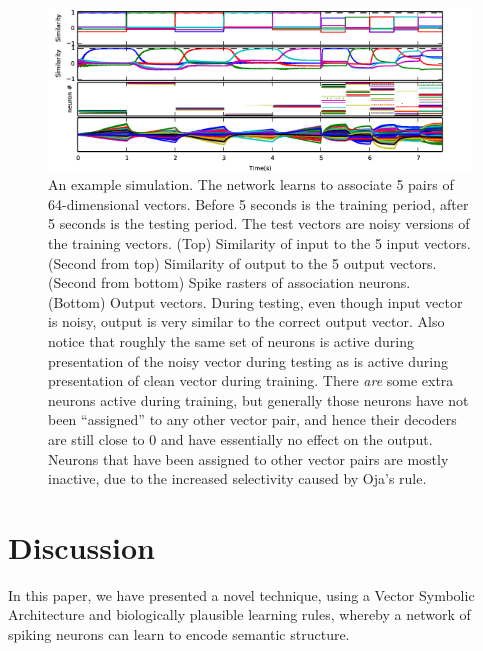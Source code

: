\documentclass[10pt,letterpaper]{article}
\begin{document}
\begin{figure}[ht]
\begin{center}
\includegraphics[width=\textwidth]{../default_plots/example_plot_D_64_N_5.png}
\end{center}
\caption{An example simulation. The network learns to associate 5 pairs of 64-dimensional vectors. Before 5 seconds is the training period, after 5 seconds is the testing period. The test vectors are noisy versions of the training vectors. (Top) Similarity of input to the 5 input vectors. (Second from top) Similarity of output to the 5 output vectors. (Second from bottom) Spike rasters of association neurons. (Bottom) Output vectors. During testing, even though input vector is noisy, output is very similar to the correct output vector. Also notice that roughly the same set of neurons is active during presentation of the noisy vector during testing as is active during presentation of clean vector during training. There \textit{are} some extra neurons active during training, but generally those neurons have not been ``assigned'' to any other vector pair, and hence their decoders are still close to 0 and have essentially no effect on the output. Neurons that have been assigned to other vector pairs are mostly inactive, due to the increased selectivity caused by Oja's rule.}
\label{fig:example}
\end{figure}

\section{Discussion}
In this paper, we have presented a novel technique, using a Vector Symbolic Architecture and biologically plausible learning rules, whereby a network of spiking neurons can learn to encode semantic structure.
\end{document}
